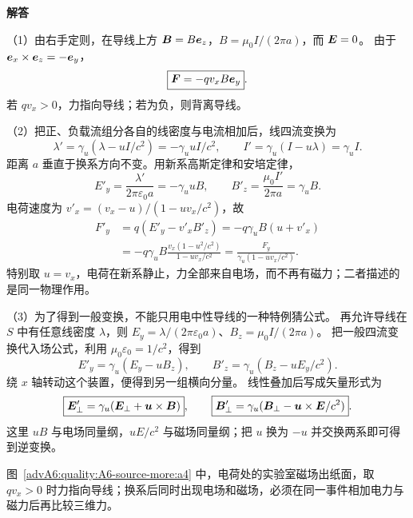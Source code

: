 \begin{advsolution}
\begin{center}\begin{minipage}{.96\linewidth}\centering
\raggedright{\bfseries\color{DeepBlue}解答}\par\smallskip\centering

\label{advA6:quality:A6-source-more:a4}
\end{minipage}\end{center}

（1）由右手定则，在导线上方 $\bm{B}=B\bm{e}_z$，$B=\mu_0I/(2\pi a)$，而 $\bm{E}=0$。
由于 $\bm{e}_x\times\bm{e}_z=-\bm{e}_y$，
\[
 \boxed{\bm{F}=-qv_xB\bm{e}_y}.
\]
若 $qv_x>0$，力指向导线；若为负，则背离导线。

（2）把正、负载流组分各自的线密度与电流相加后，线四流变换为
\[
 \lambda'=\gamma_u(\lambda-uI/c^2)=-\gamma_u uI/c^2,
 \qquad I'=\gamma_u(I-u\lambda)=\gamma_u I.
\]
距离 $a$ 垂直于换系方向不变。用新系高斯定律和安培定律，
\[
 E'_y=\frac{\lambda'}{2\pi\varepsilon_0a}=-\gamma_u uB,
 \qquad B'_z=\frac{\mu_0I'}{2\pi a}=\gamma_u B.
\]
电荷速度为 $v'_x=(v_x-u)/(1-uv_x/c^2)$，故
\begin{align*}
 F'_y&=q(E'_y-v'_xB'_z)=-q\gamma_u B(u+v'_x)\\
 &=-q\gamma_u B\frac{v_x(1-u^2/c^2)}{1-uv_x/c^2}
 =\boxed{\frac{F_y}{\gamma_u(1-uv_x/c^2)}}.
\end{align*}
特别取 $u=v_x$，电荷在新系静止，力全部来自电场，而不再有磁力；二者描述的是同一物理作用。

（3）为了得到一般变换，不能只用电中性导线的一种特例猜公式。
再允许导线在 $S$ 中有任意线密度 $\lambda$，则
$E_y=\lambda/(2\pi\varepsilon_0a)$、$B_z=\mu_0I/(2\pi a)$。
把一般四流变换代入场公式，利用 $\mu_0\varepsilon_0=1/c^2$，得到
\[
 E'_y=\gamma_u(E_y-uB_z),\qquad
 B'_z=\gamma_u(B_z-uE_y/c^2).
\]
绕 $x$ 轴转动这个装置，便得到另一组横向分量。
线性叠加后写成矢量形式为
\[
 \boxed{\bm{E}'_\perp=\gamma_u(\bm{E}_\perp+\bm{u}\times\bm{B})},\qquad
 \boxed{\bm{B}'_\perp=\gamma_u(\bm{B}_\perp-\bm{u}\times\bm{E}/c^2)}.
\]
这里 $uB$ 与电场同量纲，$uE/c^2$ 与磁场同量纲；把 $u$ 换为 $-u$ 并交换两系即可得到逆变换。

图~\ref{advA6:quality:A6-source-more:a4} 中，电荷处的实验室磁场出纸面，取 $qv_x>0$ 时力指向导线；换系后同时出现电场和磁场，必须在同一事件相加电力与磁力后再比较三维力。
\end{advsolution}


